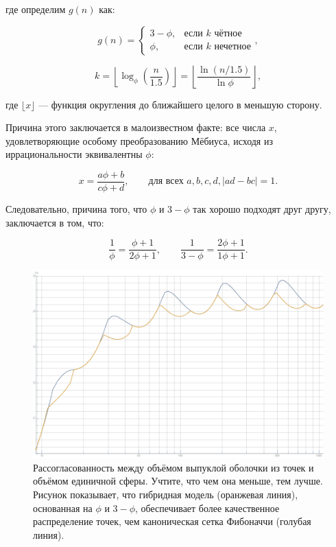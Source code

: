 \documentclass[12pt, a4paper]{article}
\begin{document}
\noindent где определим $g(n)$ как:

\begin{displaymath}
	g(n) =
		\begin{cases}
			3-\phi, & \text{если $k$ чётное} \\
			\phi, & \text{если $k$ нечетное}
		\end{cases},
	\tag{5}
\end{displaymath}

\begin{displaymath}
	k =
		\left\lfloor
			\log_{\phi}(\frac{n}{1.5})
		\right\rfloor
	  =
		\left\lfloor
			\frac{\ln (n/1.5)}{\ln \phi }
		\right\rfloor,
\end{displaymath}

\noindent где $\lfloor x \rfloor$ — функция округления до ближайшего целого в меньшую сторону.

Причина этого заключается в малоизвестном факте: все числа $x$, удовлетворяющие особому преобразованию Мёбиуса, исходя из иррациональности эквивалентны $\phi$:

\begin{displaymath}
	x = \frac{a\phi+b}{c\phi+d}, \qquad \textrm{для всех } a,b,c,d, |ad-bc|=1.
\end{displaymath}

Следовательно, причина того, что $\phi$ и $3-\phi$ так хорошо подходят друг другу, заключается в том, что:

\begin{displaymath}
	\frac{1}{\phi} = \frac{\phi+1}{2\phi+1}, \qquad \frac{1}{3-\phi}= \frac{2\phi+1}{1\phi+1}.
\end{displaymath}

\begin{figure}[H]
    \centering
    \includegraphics[width=\textwidth]{images/4.png}
    \caption{Рассогласованность между объёмом выпуклой оболочки из точек и объёмом единичной сферы. Учтите, что чем она меньше, тем лучше. Рисунок показывает, что гибридная модель (оранжевая линия), основанная на $\phi$ и $3-\phi$, обеспечивает более качественное распределение точек, чем каноническая сетка Фибоначчи (голубая линия).}
\end{figure}
\end{document}
